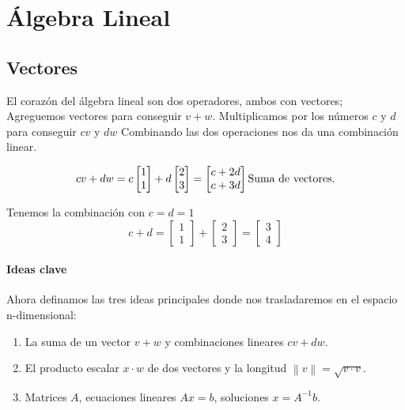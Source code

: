 \chapter{Álgebra Lineal}

\section{Vectores}
El corazón del álgebra lineal son dos operadores, ambos con vectores;
Agreguemos vectores para conseguir $v+w$. Multiplicamos por los números $c$ y $d$ para conseguir
$cv$ y $dw$ Combinando las dos operaciones nos da una combinación linear\cite{strang1993introduction}.

\begin{equation}
	cv + dw = c\begin{bmatrix} 1 \\
		1\end{bmatrix} + d\begin{bmatrix} 2 \\
		3\end{bmatrix}=\begin{bmatrix} c+2d \\
		c+3d\end{bmatrix} \textup{Suma de vectores}.
\end{equation}

\begin{example}
	Tenemos la combinación con $c=d=1$
	\begin{equation*}
		c + d = \begin{bmatrix} 1 \\ 1 \end{bmatrix} + \begin{bmatrix} 2 \\ 3 \end{bmatrix}=\begin{bmatrix} 3\\ 4 \end{bmatrix}
	\end{equation*}
\end{example}

\subsubsection{Ideas clave}

Ahora definamos las tres ideas principales donde nos trasladaremos en el espacio n-dimensional:

\begin{enumerate}
	\item La suma de un vector $v+w$ y combinaciones lineares $cv+dw$.
	\item El producto escalar $x \cdot w$ de dos vectores y la longitud $\left\lVert v \right\rVert = \sqrt{v \cdot v}$.
	\item Matrices $A$, ecuaciones lineares $Ax=b$, soluciones $x=A^{-1}b$.
\end{enumerate}

